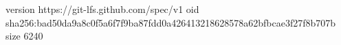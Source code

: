 version https://git-lfs.github.com/spec/v1
oid sha256:bad50da9a8c0f5a6f7f9ba87fdd0a426413218628578a62bfbcae3f27f8b707b
size 6240
